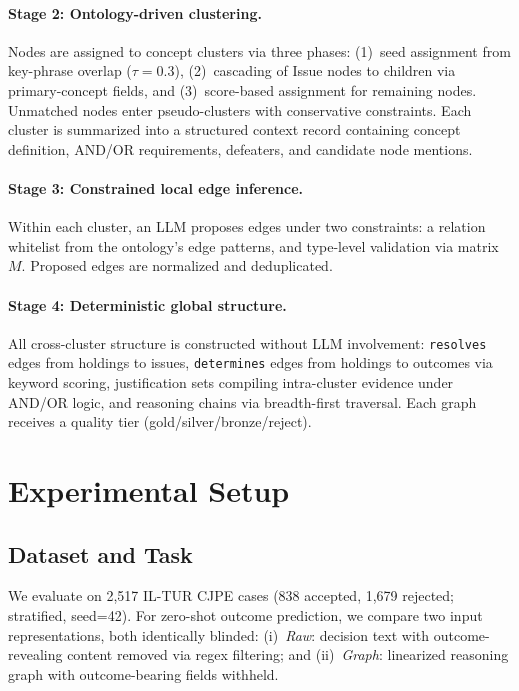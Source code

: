 \documentclass[11pt]{article}
\begin{document}
\paragraph{Stage 2: Ontology-driven clustering.}
Nodes are assigned to concept clusters via three phases: (1)~seed assignment from key-phrase overlap ($\tau = 0.3$), (2)~cascading of Issue nodes to children via primary-concept fields, and (3)~score-based assignment for remaining nodes. Unmatched nodes enter pseudo-clusters with conservative constraints. Each cluster is summarized into a structured context record containing concept definition, AND/OR requirements, defeaters, and candidate node mentions.

\paragraph{Stage 3: Constrained local edge inference.}
Within each cluster, an LLM proposes edges under two constraints: a relation whitelist from the ontology's edge patterns, and type-level validation via matrix $M$. Proposed edges are normalized and deduplicated.

\paragraph{Stage 4: Deterministic global structure.}
All cross-cluster structure is constructed without LLM involvement: \texttt{resolves} edges from holdings to issues, \texttt{determines} edges from holdings to outcomes via keyword scoring, justification sets compiling intra-cluster evidence under AND/OR logic, and reasoning chains via breadth-first traversal. Each graph receives a quality tier (gold/silver/bronze/reject).

\section{Experimental Setup}
\label{sec:setup}

\subsection{Dataset and Task}

We evaluate on 2,517 IL-TUR CJPE cases \cite{joshi2024iltur} (838 accepted, 1,679 rejected; stratified, seed=42). For zero-shot outcome prediction, we compare two input representations, both identically blinded: (i)~\textit{Raw}: decision text with outcome-revealing content removed via regex filtering; and (ii)~\textit{Graph}: linearized reasoning graph with outcome-bearing fields withheld.
\end{document}
